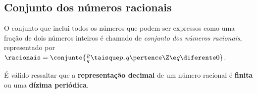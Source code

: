 \subsection{Conjunto dos números racionais}

O conjunto que inclui todos os números que podem ser expressos como uma fração de dois números inteiros é chamado de \emph{conjunto dos números racionais}, representado por $\racionais = \conjunto{\frac p q \taisque p, q \pertence \Z \e q \diferente 0}$. 

É válido ressaltar que a \textbf{representação decimal} de um número racional é \textbf{finita} ou uma \textbf{dízima periódica}. 